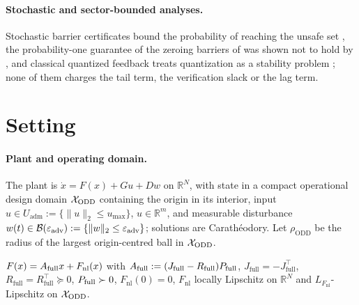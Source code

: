 \paragraph{Stochastic and sector-bounded analyses.}
Stochastic barrier certificates bound the probability of reaching the unsafe set \citep{prajna2007barrier,kushner1967stochastic,santoyo2021finitetime,jagtap2021stochastic,cosner2024freedman}, the probability-one guarantee of the zeroing barriers of \citet{clark2021stochastic} was shown not to hold by \citet{so2023almostsure}, and classical quantized feedback treats quantization as a stability problem \citep{delchamps1990quantized,elia2001limited,fu2005sector}; none of them charges the tail term, the verification slack or the lag term.

\section{Setting}
\label{sec:setting}

\paragraph{Plant and operating domain.}
The plant is $\dot x = F(x) + Gu + Dw$ on $\mathbb{R}^N$, with state in a compact operational design domain $\mathcal{X}_{\mathrm{ODD}}$ containing the origin in its interior, input $u \in U_{\mathrm{adm}} := \{\|u\|_2 \le u_{\max}\}$, $u \in \mathbb{R}^m$, and measurable disturbance $w(t) \in \mathcal{B}(\varepsilon_{\mathrm{adv}}) := \{\|w\|_2 \le \varepsilon_{\mathrm{adv}}\}$; solutions are Carath\'eodory. Let $\rho_{\mathrm{ODD}}$ be the radius of the largest origin-centred ball in $\mathcal{X}_{\mathrm{ODD}}$.

\begin{assumption}[Plant]
\label{assump:plant}
$F(x) = A_{\mathrm{full}} x + F_{\mathrm{nl}}(x)$ with $A_{\mathrm{full}} := (J_{\mathrm{full}} - R_{\mathrm{full}})P_{\mathrm{full}}$, $J_{\mathrm{full}} = -J_{\mathrm{full}}^\top$, $R_{\mathrm{full}} = R_{\mathrm{full}}^\top \succeq 0$, $P_{\mathrm{full}} \succ 0$, $F_{\mathrm{nl}}(0) = 0$, $F_{\mathrm{nl}}$ locally Lipschitz on $\mathbb{R}^N$ and $L_{F_{\mathrm{nl}}}$-Lipschitz on $\mathcal{X}_{\mathrm{ODD}}$.
\end{assumption}

